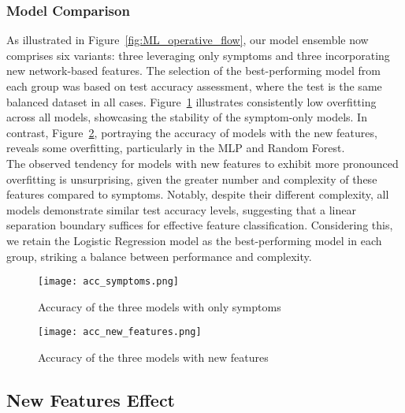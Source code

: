 \subsubsection*{Model Comparison}\label{subsubsec:results_ML_model_comparison}

As illustrated in Figure~\ref{fig:ML_operative_flow}, our model ensemble now comprises six variants:
three leveraging only symptoms and three incorporating new network-based features. The selection of
the best-performing model from each group was based on test accuracy assessment, where the test is the same balanced dataset
in all cases. Figure~\ref{fig:acc_symptoms}
illustrates consistently low overfitting across all models, showcasing the stability of the symptom-only
models. In contrast, Figure~\ref{fig:acc_new_features}, portraying the accuracy of models with the new
features, reveals some overfitting, particularly in the MLP and Random Forest.\\
The observed tendency for models with new features to exhibit more pronounced overfitting is unsurprising,
given the greater number and complexity of these features compared to symptoms. Notably, despite their different
complexity, all models demonstrate similar test accuracy levels, suggesting that a linear separation
boundary suffices for effective feature classification. Considering this, we retain the Logistic Regression
model as the best-performing model in each group, striking a balance between performance and complexity.

\begin{figure}[h]
	\centering
	\texttt{[image: acc\_symptoms.png]}
	\caption{Accuracy of the three models with only symptoms}\label{fig:acc_symptoms}
\end{figure}

\begin{figure}[h]
	\centering
	\texttt{[image: acc\_new\_features.png]}
	\caption{Accuracy of the three models with new features}\label{fig:acc_new_features}
\end{figure}




\subsection{New Features Effect}


